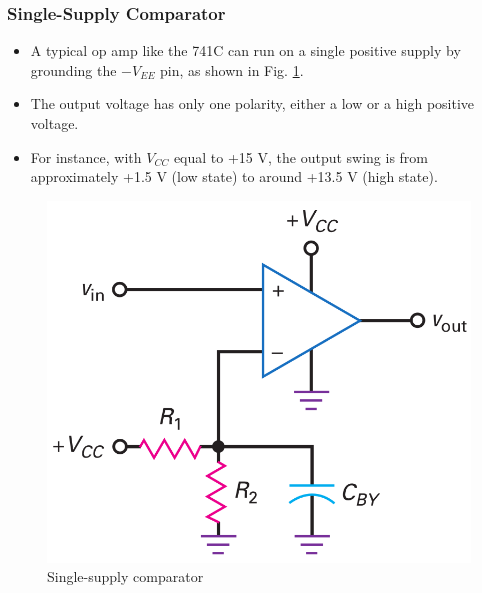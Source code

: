\documentclass[pdflatex,compress]{beamer}
\begin{document}
\begin{frame}
	\frametitle{Single-Supply Comparator}
	\begin{multicols}{2}
		\begin{itemize}
			\item A typical op amp like the 741C can run on a single positive supply by grounding the
			$-V_{EE}$ pin, as shown in Fig. \ref{fig:2012a}.
			\item The output voltage has only one polarity, either a low or a high positive voltage.
			\item For instance, with $V_{CC}$ equal to +15 V, the output swing is from approximately +1.5 V (low state) to around +13.5 V (high state).
		\end{itemize}
		\vfill\null
		\columnbreak
		\begin{figure}
			\centering
			\includegraphics[width=\linewidth]{img/2012a}
			\caption{Single-supply comparator}
			\label{fig:2012a}
		\end{figure}
	\end{multicols}
\end{frame}
\end{document}

